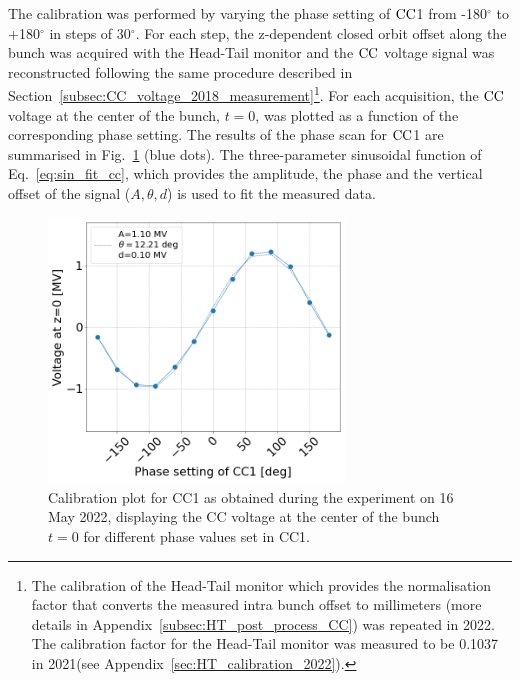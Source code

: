 The calibration was performed by varying the phase setting of ${\mathrm{CC}}$1 from -180$^\circ$ to +180$^\circ$ in steps of 30$^\circ$. For each step, the z-dependent closed orbit offset along the bunch was acquired with the Head-Tail monitor and the ${\mathrm{CC}}$ voltage signal was reconstructed following the same procedure described in Section~\ref{subsec:CC_voltage_2018_measurement}\footnote{The calibration of the Head-Tail monitor which provides the normalisation factor that converts the measured intra bunch offset to millimeters (more details in Appendix~\ref{subsec:HT_post_process_CC}) was repeated in 2022. The calibration factor for the Head-Tail monitor was measured to be 0.1037 in 2021(see Appendix~\ref{sec:HT_calibration_2022}).}. For each acquisition, the ${\mathrm{CC}}$ voltage at the center of the bunch, $t=0$, was plotted as a function of the corresponding phase setting. The results of the phase scan for ${\mathrm{CC}}$1 are summarised in Fig.~\ref{fig:Vcc_calibration_md_2022} (blue dots). 
The three-parameter sinusoidal function of Eq.~\eqref{eq:sin_fit_cc}, which provides the amplitude, the phase and the vertical offset of the signal ($A, \theta, d$) is used to fit the measured data.



\begin{figure}[!h] %
   \centering         
   \includegraphics[width=0.7\textwidth]{images/Ch8/Vcc_at_z_zero_vs_inspector_phase_CC1_for_thesis_new_xlabel_may22.png}
       \caption{Calibration plot for CC1 as obtained during the experiment on 16 May 2022, displaying the CC voltage at the center of the bunch $t=0$ for different phase values set in CC1.}
       \label{fig:Vcc_calibration_md_2022}
\end{figure}

